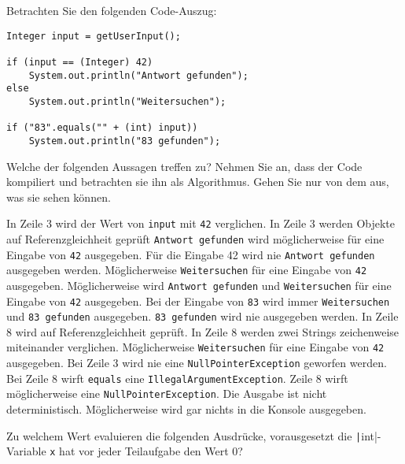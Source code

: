 \documentclass[11pt]{exam} %
\newcommand{\code}[1]{\texttt|#1|}
\begin{document}
\begin{questions}
\question Betrachten Sie den folgenden Code-Auszug:
\begin{verbatim}
Integer input = getUserInput();

if (input == (Integer) 42)
	System.out.println("Antwort gefunden");
else
	System.out.println("Weitersuchen");
	
if ("83".equals("" + (int) input))
	System.out.println("83 gefunden");
\end{verbatim}
Welche der folgenden Aussagen treffen zu? Nehmen Sie an, dass der Code kompiliert und betrachten sie ihn als Algorithmus. Gehen Sie nur von dem aus, was sie sehen können. 
\begin{checkboxes}
\choice In Zeile 3 wird der Wert von \texttt{input} mit \texttt{42} verglichen.
\CorrectChoice In Zeile 3 werden Objekte auf Referenzgleichheit geprüft
\CorrectChoice \texttt{Antwort gefunden} wird möglicherweise für eine Eingabe von \texttt{42} ausgegeben.
\choice Für die Eingabe 42 wird nie \texttt{Antwort gefunden} ausgegeben werden.
\CorrectChoice Möglicherweise \texttt{Weitersuchen} für eine Eingabe von \texttt{42} ausgegeben.
\choice Möglicherweise wird \texttt{Antwort gefunden} und \texttt{Weitersuchen} für eine Eingabe von \texttt{42} ausgegeben.
\CorrectChoice Bei der Eingabe von \texttt{83} wird immer \texttt{Weitersuchen} und \texttt{83 gefunden} ausgegeben.
\choice \texttt{83 gefunden} wird nie ausgegeben werden.
\choice In Zeile 8 wird auf Referenzgleichheit geprüft.
\CorrectChoice In Zeile 8 werden zwei Strings zeichenweise miteinander verglichen.
\CorrectChoice Möglicherweise \texttt{Weitersuchen} für eine Eingabe von \texttt{42} ausgegeben.
\choice Bei Zeile 3 wird nie eine \texttt{NullPointerException} geworfen werden.
\CorrectChoice Bei Zeile 8 wirft \texttt{equals} eine \texttt{IllegalArgumentException}.
\CorrectChoice Zeile 8 wirft möglicherweise eine \texttt{NullPointerException}.
\choice Die Ausgabe ist nicht deterministisch.
\CorrectChoice Möglicherweise wird gar nichts in die Konsole ausgegeben.
\end{checkboxes}
\question Zu welchem Wert evaluieren die folgenden Ausdrücke, vorausgesetzt die \code{int}-Variable \texttt{x} hat vor jeder Teilaufgabe den Wert 0?
\begin{parts}

\end{parts}
\end{questions}
\end{document}
